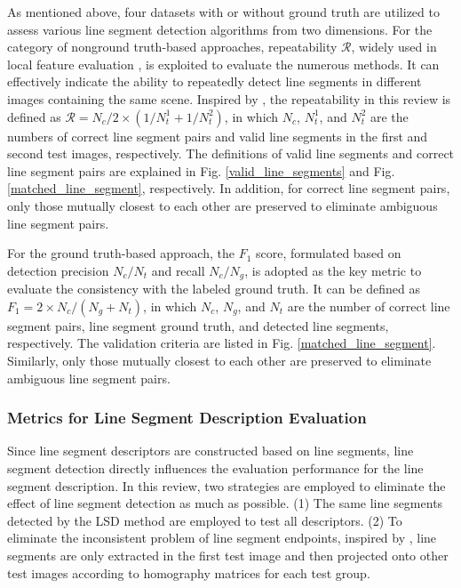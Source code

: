 \documentclass[journal,compsoc]{IEEEtran}
\begin{document}
As mentioned above, four datasets with or without ground truth are utilized to assess various line segment detection algorithms from two dimensions. For the category of nonground truth-based approaches, repeatability $\mathcal{R}$, widely used in local feature evaluation \cite{repeatability}, is exploited to evaluate the numerous methods. It can effectively indicate the ability to repeatedly detect line segments in different images containing the same scene. Inspired by \cite{CPDA}, the repeatability in this review is defined as $\mathcal{R} = {N_c}/{2} \times (1/{N^1_t} + 1/{N^2_t})$, in which $N_c$, $N^1_t$, and $N^2_t$ are the numbers of correct line segment pairs and valid line segments in the first and second test images, respectively. The definitions of valid line segments and correct line segment pairs are explained in Fig. \ref{valid_line_segments} and Fig. \ref{matched_line_segment}, respectively. In addition, for correct line segment pairs, only those mutually closest to each other are preserved to eliminate ambiguous line segment pairs.

For the ground truth-based approach, the $F_1$ score, formulated based on detection precision $N_c/N_t$ and recall $N_c/N_g$, is adopted as the key metric to evaluate the consistency with the labeled ground truth. It can be defined as $F_1 = 2 \times N_c / (N_g+N_t)$, in which $N_c$, $N_g$, and $N_t$ are the number of correct line segment pairs, line segment ground truth, and detected line segments, respectively. The validation criteria are listed in Fig. \ref{matched_line_segment}. Similarly, only those mutually closest to each other are preserved to eliminate ambiguous line segment pairs.

\subsubsection{Metrics for Line Segment Description Evaluation}
Since line segment descriptors are constructed based on line segments, line segment detection directly influences the evaluation performance for the line segment description. In this review, two strategies are employed to eliminate the effect of line segment detection as much as possible. (1) The same line segments detected by the LSD \cite{LSD} method are employed to test all descriptors. (2) To eliminate the inconsistent problem of line segment endpoints, inspired by \cite{HPatches}, line segments are only extracted in the first test image and then projected onto other test images according to homography matrices for each test group.
\end{document}
